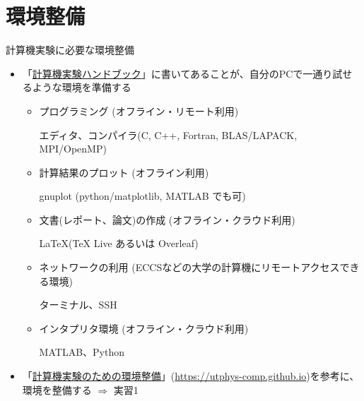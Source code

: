 \section{環境整備}

\begin{frame}[t,fragile]{計算機実験に必要な環境整備}
  \begin{itemize}
  \item 「\href{https://github.com/utphys-comp/handbook/releases/download/handbook-2021/handbook.pdf}{計算機実験ハンドブック}」に書いてあることが、自分のPCで一通り試せるような環境を準備する
    \begin{itemize}
    \item プログラミング (オフライン・リモート利用)

      エディタ、コンパイラ(C, C++, Fortran, BLAS/LAPACK, MPI/OpenMP)
    \item 計算結果のプロット (オフライン利用)

      gnuplot (python/matplotlib, MATLAB でも可)
    \item 文書(レポート、論文)の作成 (オフライン・クラウド利用)

      \LaTeX (TeX Live あるいは Overleaf)
    \item ネットワークの利用 (ECCSなどの大学の計算機にリモートアクセスできる環境)

      ターミナル、SSH
    \item インタプリタ環境 (オフライン・クラウド利用)

      MATLAB、Python
    \end{itemize}
  \item 「\href{https://utphys-comp.github.io}{計算機実験のための環境整備}」({\small \href{https://utphys-comp.github.io}{https://utphys-comp.github.io}})を参考に、環境を整備する $\Rightarrow$ 実習1
  \end{itemize}
\end{frame}
